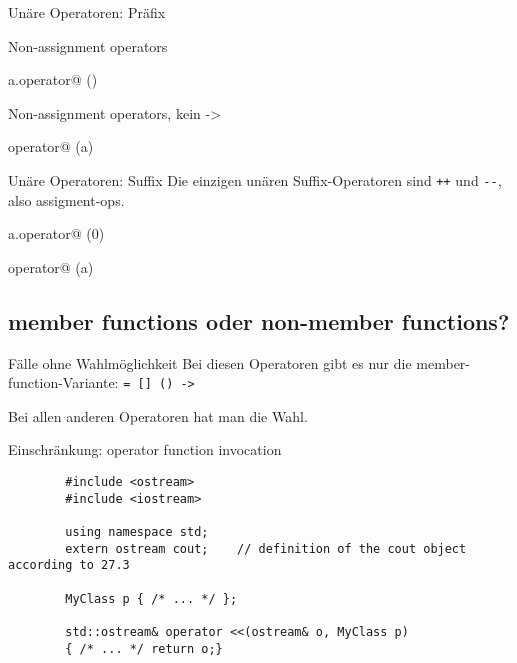 \begin{frame}{Unäre Operatoren: Präfix}
	\onslide*<+>
	{
		Non-assignment operators
		
		\begin{block}{a.operator@ ()}
			
		\end{block}
	}
	
	\onslide*<+>
	{
		Non-assignment operators, kein -\textgreater
		
		\begin{block}{operator@ (a)}
			
		\end{block}
	}
\end{frame}

\begin{frame}[fragile]{Unäre Operatoren: Suffix}
	Die einzigen unären Suffix-Operatoren sind \verb!++! und \verb!--!, also assigment-ops.
	
	\onslide*<+>
	{
		\begin{block}{a.operator@ (0)}
			
		\end{block}
	}
	
	\onslide*<+>
	{
		\begin{block}{operator@ (a)}
			
		\end{block}
	}
\end{frame}




\subsection{member functions oder non-member functions?}

\begin{frame}[fragile]{Fälle ohne Wahlmöglichkeit}
	Bei diesen Operatoren gibt es nur die member-function-Variante: \verb!= [] () ->!
	
	\pause
	\vspace{1em}
	
	Bei allen anderen Operatoren hat man die Wahl.
	
	Einschränkung: operator function invocation
	\begin{lstlisting}
		#include <ostream>
		#include <iostream>
		
		using namespace std;
		extern ostream cout;	// definition of the cout object according to 27.3
		
		MyClass p { /* ... */ };
		
		std::ostream& operator <<(ostream& o, MyClass p)
		{ /* ... */ return o;}
	\end{lstlisting}
\end{frame}


